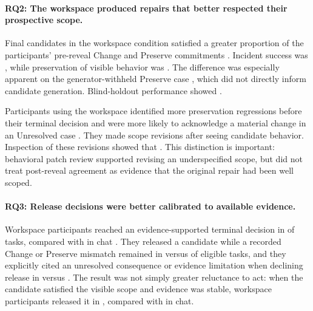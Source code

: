 \paragraph{RQ2: The workspace produced repairs that better respected their
prospective scope.}
Final candidates in the workspace condition satisfied a greater proportion of
the participants' pre-reveal Change and Preserve commitments
. Incident
success was , while preservation of
visible behavior was . The difference was
especially apparent on the generator-withheld Preserve case
, which did not directly inform candidate
generation. Blind-holdout performance showed .

Participants using the workspace identified more preservation regressions
before their terminal decision  and were more likely
to acknowledge a material change in an Unresolved case
. They made  scope revisions after seeing candidate behavior. Inspection of
these revisions showed that . This
distinction is important: behavioral patch review supported revising an
underspecified scope, but did not treat post-reveal agreement as evidence that
the original repair had been well scoped.

\paragraph{RQ3: Release decisions were better calibrated to available
evidence.}
Workspace participants reached an evidence-supported terminal decision in
 of tasks, compared with  in
chat . They released a candidate while
a recorded Change or Preserve mismatch remained in 
versus  of eligible tasks, and they explicitly cited an
unresolved consequence or evidence limitation when declining release in
 versus . The result was not
simply greater reluctance to act: when the candidate satisfied the visible
scope and evidence was stable, workspace participants released it in
, compared with  in chat.

